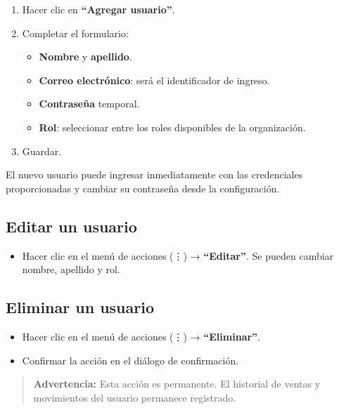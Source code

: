 \begin{enumerate}
\def\labelenumi{\arabic{enumi}.}
\tightlist
\item
  Hacer clic en \textbf{``Agregar usuario''}.
\item
  Completar el formulario:

  \begin{itemize}
  \tightlist
  \item
    \textbf{Nombre} y \textbf{apellido}.
  \item
    \textbf{Correo electrónico}: será el identificador de ingreso.
  \item
    \textbf{Contraseña} temporal.
  \item
    \textbf{Rol}: seleccionar entre los roles disponibles de la organización.
  \end{itemize}
\item
  Guardar.
\end{enumerate}

El nuevo usuario puede ingresar inmediatamente con las credenciales proporcionadas y cambiar su contraseña desde la configuración.

\subsection{Editar un usuario}\label{editar-un-usuario}

\begin{itemize}
\tightlist
\item
  Hacer clic en el menú de acciones (⋮) → \textbf{``Editar''}. Se pueden cambiar nombre, apellido y rol.
\end{itemize}

\subsection{Eliminar un usuario}\label{eliminar-un-usuario}

\begin{itemize}
\tightlist
\item
  Hacer clic en el menú de acciones (⋮) → \textbf{``Eliminar''}.
\item
  Confirmar la acción en el diálogo de confirmación.
\end{itemize}

\begin{quote}
\textbf{Advertencia:} Esta acción es permanente. El historial de ventas y movimientos del usuario permanece registrado.
\end{quote}

